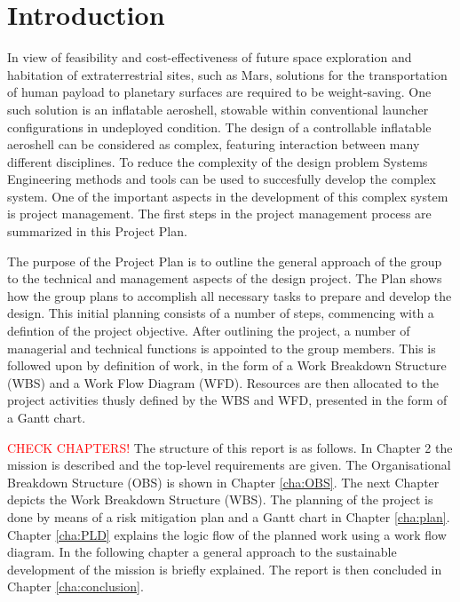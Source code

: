 \section{Introduction}\label{cha:introduction}
In view of feasibility and cost-effectiveness of future space exploration and habitation of extraterrestrial sites, such as Mars, solutions for the transportation of human payload to planetary surfaces are required to be weight-saving. One such solution is an inflatable aeroshell, stowable within conventional launcher configurations in undeployed condition. The design of a controllable inflatable aeroshell can be considered as complex, featuring interaction between many different disciplines. To reduce the complexity of the design problem Systems Engineering methods and tools can be used to succesfully develop the complex system. One of the important aspects in the development of this complex system is project management. The first steps in the project management process are summarized in this Project Plan.

The purpose of the Project Plan is to outline the general approach of the group to the technical and management aspects of the design project. The Plan shows how the group plans to accomplish all necessary tasks to prepare and develop the design. This initial planning consists of a number of steps, commencing with a defintion of the project objective. After outlining the project, a number of managerial and technical functions is appointed to the group members. This is followed upon by definition of work, in the form of a Work Breakdown Structure (WBS) and a Work Flow Diagram (WFD). Resources are then allocated to the project activities thusly defined by the WBS and WFD, presented in the form of a Gantt chart.

\textcolor{red}{CHECK CHAPTERS!}
The structure of this report is as follows. In Chapter 2 the mission is described and the top-level requirements are given. The Organisational Breakdown Structure (OBS) is shown in Chapter \ref{cha:OBS}. The next Chapter depicts the Work Breakdown Structure (WBS). The planning of the project is done by means of a risk mitigation plan and a Gantt chart in Chapter \ref{cha:plan}. Chapter \ref{cha:PLD} explains the logic flow of the planned work using a work flow diagram. In the following chapter a general approach to the sustainable development of the mission is briefly explained. The report is then concluded in Chapter \ref{cha:conclusion}.